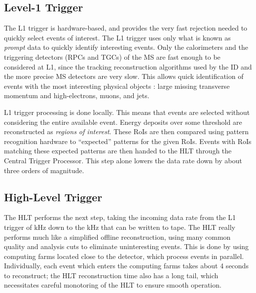 \subsection{Level-1 Trigger}

The L1 trigger is hardware-based, and provides the very fast rejection needed to quickly select events of interest.
The L1 trigger uses only what is known as \textit{prompt} data to quickly identify interesting events.
Only the calorimeters and the triggering detectors (RPCs and TGCs)  of the MS are fast enough to be considered at L1, since the tracking reconstruction algorithms used by the ID and the more precise MS detectors are very slow.
This allows quick identification of events with the most interesting physical objects : large missing transverse momentum and high-\pt electrons, muons, and jets.

L1 trigger processing is done locally.
This means that events are selected without considering the entire available event.
Energy deposits over some threshold are reconstructed as \textit{regions of interest}.
These RoIs are then compared using pattern recognition hardware to ``expected'' patterns for the given RoIs.
Events with RoIs matching these expected patterns are then handed to the HLT through the Central Trigger Processor.
This step alone lowers the data rate down by about three orders of magnitude.

\subsection{High-Level Trigger}

The HLT performs the next step, taking the incoming data rate from the L1 trigger of  kHz down to the  kHz that can be written to tape.
The HLT really performs much like a simplified offline reconstruction, using many common quality and analysis cuts to eliminate uninteresting events.
This is done by using computing farms located close to the detector, which process events in parallel.
Individually, each event which enters the computing farms takes about 4 seconds to reconstruct; the HLT reconstruction time also has a long tail, which necessitates careful monotoring of the HLT to ensure smooth operation.

